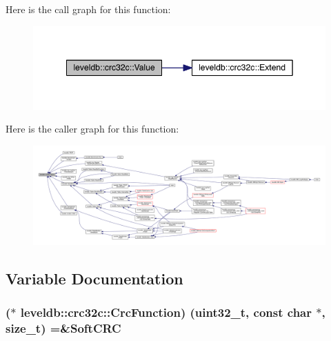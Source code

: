 Here is the call graph for this function\+:\nopagebreak
\begin{figure}[H]
\begin{center}
\leavevmode
\includegraphics[width=348pt]{namespaceleveldb_1_1crc32c_ac004d1e3d8c75b033c162e5ae0a5cc2c_cgraph}
\end{center}
\end{figure}




Here is the caller graph for this function\+:
\nopagebreak
\begin{figure}[H]
\begin{center}
\leavevmode
\includegraphics[width=350pt]{namespaceleveldb_1_1crc32c_ac004d1e3d8c75b033c162e5ae0a5cc2c_icgraph}
\end{center}
\end{figure}




\subsection{Variable Documentation}
\hypertarget{namespaceleveldb_1_1crc32c_a6d47e5e948707883faef34642ea854df}{}
\subsubsection[{Crc\+Function}]{($\ast$ leveldb\+::crc32c\+::\+Crc\+Function) ({\bf uint32\+\_\+t}, const char $\ast$, size\+\_\+t) =\&{\bf Soft\+C\+R\+C}\hspace{0.3cm}{\ttfamily [static]}}\label{namespaceleveldb_1_1crc32c_a6d47e5e948707883faef34642ea854df}
\hypertarget{namespaceleveldb_1_1crc32c_ae1bd49dbeac3e469a5a4347989f2e8b3}{}
